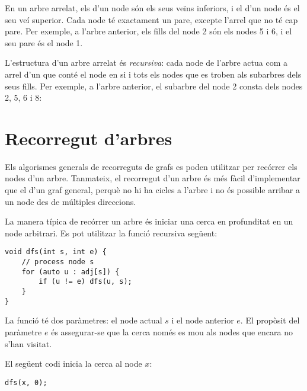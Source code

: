 En un arbre arrelat, els  d'un node són els seus veïns
inferiors, i el  d'un node és el seu veí superior. Cada
node té exactament un pare, excepte l'arrel que no té cap pare. Per
exemple, a l'arbre anterior, els fills del node 2 són els nodes 5 i 6,
i el seu pare és el node 1.


L'estructura d'un arbre arrelat és \emph{recursiva}: cada node de
l'arbre actua com a arrel d'un  que conté el node en si
i tots els nodes que es troben als subarbres dels seus fills. Per
exemple, a l'arbre anterior, el subarbre del node 2 consta dels nodes
2, 5, 6 i 8:
\begin{center}
\end{center}


\section{Recorregut d'arbres}

Els algorismes generals de recorreguts de grafs es poden utilitzar per
recórrer els nodes d'un arbre. Tanmateix, el recorregut d'un arbre és
més fàcil d'implementar que el d'un graf general, perquè no hi ha
cicles a l'arbre i no és possible arribar a un node des de múltiples
direccions.

La manera típica de recórrer un arbre és iniciar una cerca en
profunditat en un node arbitrari. Es pot utilitzar la funció recursiva
següent:


\begin{lstlisting}
void dfs(int s, int e) {
    // process node s
    for (auto u : adj[s]) {
        if (u != e) dfs(u, s);
    }
}
\end{lstlisting}


La funció té dos paràmetres: el node actual $s$ i el node anterior
$e$. El propòsit del paràmetre $e$ és assegurar-se que la cerca només
es mou als nodes que encara no s'han visitat.

El següent codi inicia la cerca al node $x$:


\begin{lstlisting}
dfs(x, 0);
\end{lstlisting}


